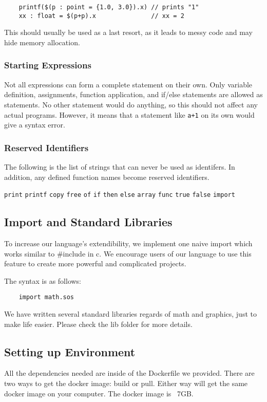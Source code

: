 \documentclass[main.tex]{subfiles}
\begin{document}
	\begin{lstlisting}
	printf($(p : point = {1.0, 3.0}).x) // prints "1"
	xx : float = $(p+p).x               // xx = 2 \end{lstlisting}
	
	This should usually be used as a last resort, as it leads to messy code and may hide memory allocation.
	
	\subsubsection{Starting Expressions}
	Not all expressions can form a complete statement on their own. Only variable definition, assignments, function application, and if/else statements are allowed as statements. No other statement would do anything, so this should not affect any actual programs. However, it means that a statement like \texttt{a+1} on its own would give a syntax error.
	
	\subsubsection{Reserved Identifiers}
	The following is the list of strings that can never be used as identifers. In addition, any defined function names become reserved identifiers.
	
	\texttt{print}  \texttt{printf}  \texttt{copy}  \texttt{free}  \texttt{of}  \texttt{if} \texttt{then}  \texttt{else}  \texttt{array}  \texttt{func}  \texttt{true}  \texttt{false}  \texttt{import}

	\subsection{Import and Standard Libraries}
	To increase our language’s extendibility, we implement one naive import which works similar to \#include in c. We encourage users of our language to use this feature to create more powerful and complicated projects.

	The syntax is as follows:

	\begin{lstlisting}
    import math.sos
	\end{lstlisting}

	We have written several standard libraries regards of math and graphics, just to make life easier. Please check the lib folder for more details.
	
	\subsection{Setting up Environment}
	All the dependencies needed are inside of the Dockerfile we provided. There are two ways to get the docker image: build or pull. Either way will get the same docker image on your computer. The docker image is ~7GB.
\end{document}
